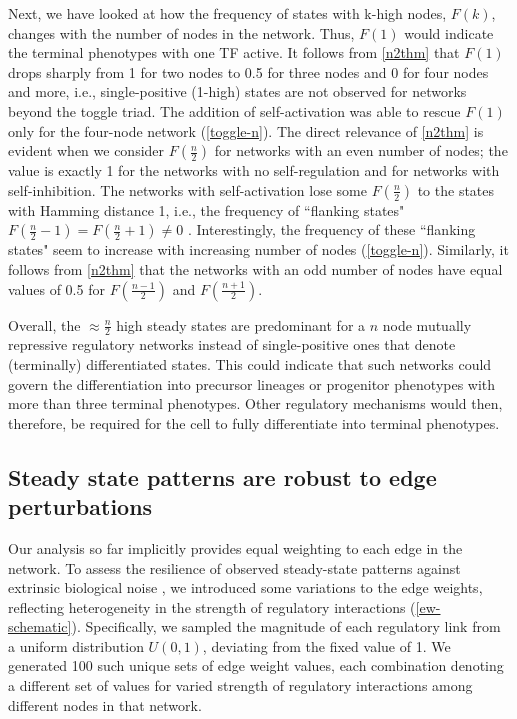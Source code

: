 \documentclass[11pt,a4paper]{article}
\theoremstyle{definition}
\theoremstyle{remark}
\begin{document}
Next, we have looked at how the frequency of states with k-high nodes, $F(k)$, changes with the number of nodes in the network. Thus, $F(1)$ would indicate the terminal phenotypes with one TF active. It follows from \cref{n2thm} that $F(1)$ drops sharply from 1 for two nodes to 0.5 for three nodes and 0 for four nodes and more, i.e., single-positive (1-high) states are not observed for networks beyond the toggle triad. The addition of self-activation was able to rescue $F(1)$ only for the four-node network (\cref{toggle-n}). The direct relevance of \cref{n2thm} is evident when we consider $F(\frac{n}{2})$ for networks with an even number of nodes; the value is exactly 1 for the networks with no self-regulation and for networks with self-inhibition. The networks with self-activation lose some $F(\frac{n}{2})$ to the states with Hamming distance 1, i.e., the frequency of ``flanking states" $F(\frac{n}{2}-1) =F(\frac{n}{2}+1) \not =0$ . Interestingly, the frequency of these ``flanking states" seem to increase with increasing number of nodes (\cref{toggle-n}). Similarly, it follows from \cref{n2thm} that the networks with an odd number of nodes have equal values of 0.5 for $F(\frac{n-1}{2})$ and $F(\frac{n+1}{2})$.

Overall, the $\approx \frac{n}{2}$ high steady states are predominant for a $n$ node mutually repressive regulatory networks instead of single-positive ones that denote (terminally) differentiated states. This could indicate that such networks could govern the differentiation into precursor lineages or progenitor phenotypes with more than three terminal phenotypes. Other regulatory mechanisms would then, therefore, be required for the cell to fully differentiate into terminal phenotypes.

\subsection{Steady state patterns are robust to edge perturbations}

Our analysis so far implicitly provides equal weighting to each edge in the network. To assess the resilience of observed steady-state patterns against extrinsic biological noise \parencite{elowitz_stochastic_2002}, we introduced some variations to the edge weights, reflecting heterogeneity in the strength of regulatory interactions (\cref{ew-schematic}). Specifically, we sampled the magnitude of each regulatory link from a uniform distribution $U(0,1)$, deviating from the fixed value of 1. We generated 100 such unique sets of edge weight values, each combination denoting a different set of values for varied strength of regulatory interactions among different nodes in that network. 
\end{document}
